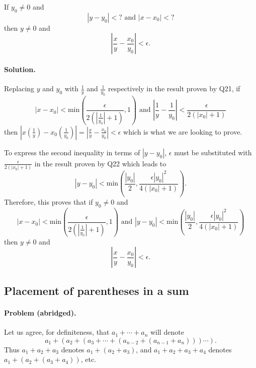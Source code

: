 \documentclass{article}
\begin{document}
If $y_0 \neq 0$ and \begin{equation*}
  |y - y_0| < ? \text{ and } |x - x_0| < ?
\end{equation*} then $y \neq 0$ and \begin{equation*}
  \left|\frac{x}{y} - \frac{x_0}{y_0}\right| < \epsilon.
\end{equation*}

\paragraph{Solution.} Replacing $y$ and $y_0$ with $\frac{1}{y}$ and
$\frac{1}{y_0}$ respectively in the result proven by Q21, if \begin{equation*}
  |x - x_0| < \text{min}\left(\frac{\epsilon}{2(|\frac{1}{y_0}| + 1)}, 1\right)
  \text{ and } \left|\frac{1}{y} - \frac{1}{y_0}\right| <
  \frac{\epsilon}{2(|x_0| + 1)}
\end{equation*} then $|x(\frac{1}{y}) - x_0(\frac{1}{y_0})| = \left|\frac{x}{y}
- \frac{x_0}{y_0}\right| < \epsilon$ which is what we are looking to prove.

To express the second inequality in terms of $|y - y_0|$, $\epsilon$ must be
substituted with $\frac{\epsilon}{2(|x_0| + 1)}$ in the result proven by Q22
which leads to \begin{equation*}
  |y - y_0| < \text{min}\left(\frac{|y_0|}{2},
  \frac{\epsilon|y_0|^2}{4(|x_0| + 1)}\right).
\end{equation*}
Therefore, this proves that if $y_0 \neq 0$ and \begin{equation*}
  |x - x_0| < \text{min}\left(\frac{\epsilon}{2(|\frac{1}{y_0}| + 1)}, 1\right)
  \text{ and } |y - y_0| < \text{min}\left(\frac{|y_0|}{2},
  \frac{\epsilon|y_0|^2}{4(|x_0| + 1)}\right)
\end{equation*} then $y \neq 0$ and \begin{equation*}
  \left|\frac{x}{y} - \frac{x_0}{y_0}\right| < \epsilon.
\end{equation*}

\setcounter{subsection}{23}
\subsection{Placement of parentheses in a sum}

\paragraph{Problem (abridged).} Let us agree, for definiteness, that $a_1 +
\cdots + a_n$ will denote \begin{equation*}
  a_1 + (a_2 + (a_3 + \cdots + (a_{n-2} + (a_{n-1} + a_n)))\cdots).
\end{equation*}
Thus $a_1 + a_2 + a_3$ denotes $a_1 + (a_2 + a_3)$, and $a_1 + a_2 + a_3 + a_4$
denotes $a_1 + (a_2 + (a_3 + a_4))$, etc.
\end{document}
